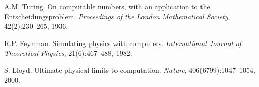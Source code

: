 \documentclass[12pt,a4paper]{article}
\begin{document}
\begin{thebibliography}{99}
A.M. Turing.
On computable numbers, with an application to the Entscheidungsproblem.
\textit{Proceedings of the London Mathematical Society}, 42(2):230--265, 1936.

R.P. Feynman.
Simulating physics with computers.
\textit{International Journal of Theoretical Physics}, 21(6):467--488, 1982.

S. Lloyd.
Ultimate physical limits to computation.
\textit{Nature}, 406(6799):1047--1054, 2000.

\end{thebibliography}
\end{document}
